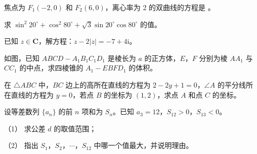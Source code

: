 \begin{question}
焦点为 \(F_1(-2,0)\) 和 \(F_2(6,0)\)，离心率为 2 的双曲线的方程是 \underline{\qquad}。

\end{question}
\begin{question}
求 \(\sin^2 20^\circ+\cos^2 80^\circ+\sqrt{3}\sin 20^\circ\cos 80^\circ\) 的值。

\end{question}
\begin{question}
已知 \(z\in\mathbf{C}\)，解方程：\(z-2|z|=-7+4\mathrm{i}\)。

\Needspace{0.4\textheight}
\end{question}
\begin{question}
如图，已知 \(ABCD-A_1B_1C_1D_1\) 是棱长为 \(a\) 的正方体，\(E\)，\(F\) 分别为棱 \(AA_1\) 与 \(CC_1\) 的中点，求四棱锥的 \(A_1-EBFD_1\) 的体积。
\nopagebreak[4]
\begin{center}\end{center}
\nopagebreak[4]
\end{question}
\begin{question}
在 \(\triangle ABC\) 中，\(BC\) 边上的高所在直线的方程为 \(2-2y+1=0\)，\(\angle A\) 的平分线所在直线的方程为 \(y=0\)，若点 \(B\) 的坐标为 \((1,2)\)，求点 \(A\) 和点 \(C\) 的坐标。

\end{question}
\begin{question}
设等差数列 \(\{a_n\}\) 的前 \(n\) 项和为 \(S_n\)。已知 \(a_3=12\)，\(S_{12}>0\)，\(S_{13}<0\)。

（1） 求公差 \(d\) 的取值范围；

（2） 指出 \(S_1\)，\(S_2\)，\(\cdots\)，\(S_{12}\) 中哪一个值最大，并说明理由。

\end{question}